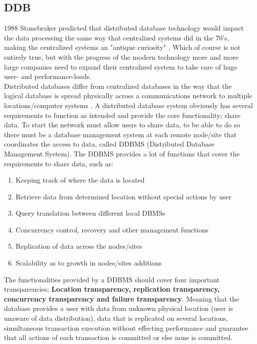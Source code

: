\documentclass{cslthse-msc}
\begin{document}
\subsection{DDB}
1988 Stonebraker predicted that distributed database technology would impact the data processing the same way that centralized systems did in the 70's, making the centralized systems an "antique curiosity"  \cite{DDBMSvsCDBMS}. Which of course is not entirely true, but with the progress of the modern technology more and more large companies need to expand their centralized system to take care of huge user- and performance-loads.\\  
Distributed databases differ from centralized databases in the way that the logical database is spread physically across a communications network to multiple locations/computer systems \cite{DDBMS}. A distributed database system obviously has several requirements to function as intended and provide the core functionality; share data. To start the network must allow users to share data, to be able to do so there must be a database management system at each remote node/site that coordinates the access to data, called DDBMS (Distributed Database Management System). The DDBMS provides a lot of functions that cover the requirements to share data, such as: \begin{enumerate}
\item Keeping track of where the data is located
\item Retrieve data from determined location without special actions by user
\item Query translation between different local DBMSs
\item Concurrency control, recovery and other management functions
\item Replication of data across the nodes/sites
\item Scalability as to growth in nodes/sites additions \begin{flushright}  \cite{functionsDDBMS}
\cite{datareplication}   \end{flushright}
\end{enumerate}      
The functionalities provided by a DDBMS should cover four important transparencies; \textbf{Location transparency, replication transparency, concurrency transparency and failure transparency}. Meaning that the database provides a user with data from unknown physical location (user is unaware of data distribution), data that is replicated on several locations, simultaneous transaction execution without effecting performance and guarantee that all actions of each transaction is committed or else none is committed.\\\\
\end{document}
